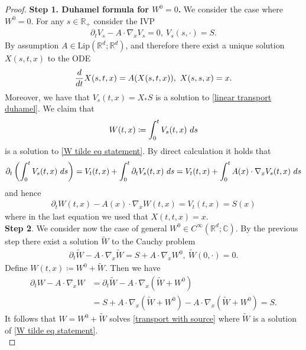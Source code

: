 \documentclass[10pt,a4paper]{amsart}
\def\dd{{\rm d}}
\begin{document}
\begin{proof}
\textbf{Step 1. Duhamel formula for $W^{0}=0$.} We consider the case where $W^{0}=0$. For any $s\in \mathbb{R}_{+}$ consider the IVP 
\begin{align}
\partial_{t}V_{s}-A\cdot \nabla_{x}V_{s}=0, \ V_{s}(s,\cdot)=S. \label{linear transport duhamel}    
\end{align}
By assumption $A\in \mathrm{Lip}(\mathbb{R}^{d};\mathbb{R}^{d})$, and therefore there exist a unique  solution $X(s,t,x)$ to the  ODE 
\begin{align}
\frac{\dd}{\dd t}X(s,t,x)=A(X(s,t,x)),\ X(s,s,x)=x.\label{Flow ODE}
\end{align} 
Moreover, we have that  $V_{s}(t,x)=X_{\ast}S$ is a solution to \eqref{linear transport duhamel}. We claim that 
\begin{align*}
W(t,x)\coloneqq \int_{0}^{t}V_{s}(t,x) \ \dd s     
\end{align*} 
is a solution to \eqref{W tilde eq statement}. By direct calculation it holds that   
\begin{align*}
\partial_{t}\left(\int_{0}^{t}V_{s}(t,x)\ \dd s\right)=V_{t}(t,x)+\int_{0}^{t}\partial_{t}V_{s}(t,x)\ \dd s= V_{t}(t,x)+\int_{0}^{t} A(x)\cdot \nabla_{x}V_{s}(t,x)\ \dd s 
\end{align*}   
and hence 
\begin{align*}
 \partial_{t}W(t,x)-A(x)\cdot \nabla_{x}W(t,x)=V_{t}(t,x)=S(x)   
\end{align*}
where in the last equation we used that  $X(t,t,x)=x$. \\
\textbf{Step 2}. We consider now the case of general $W^{0}\in C^{\infty}(\mathbb{R}^{d};\mathbb{C})$. By the previous step there exist a  solution $\widetilde{W}$  to the Cauchy problem 
\begin{align}
\partial_{t}\widetilde{W}-A\cdot \nabla_{x}\widetilde{W}=S+A\cdot \nabla_{x}W^{0}, \ \widetilde{W}(0,\cdot)=0. \label{W tilde eq}  
\end{align}
Define $W(t,x)\coloneqq W^{0}+\widetilde{W}$.  Then we have 
\begin{align*}
\partial_{t}W-A\cdot \nabla_{x}W&=\partial_{t}\widetilde{W}-A\cdot \nabla_{x}(\widetilde{W}+W^{0})\\
&=S+A\cdot \nabla_{x}(\widetilde{W}+W^{0})-A\cdot \nabla_{x}(\widetilde{W}+W^{0})=S.     
\end{align*}
It follows that $W=W^{0}+\widetilde{W}$ solves \eqref{transport with source} where $\widetilde{W}$ is a solution of \eqref{W tilde eq statement}.\\ 

\end{proof}
\end{document}
